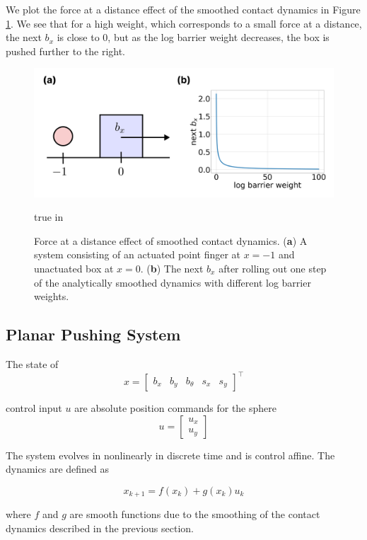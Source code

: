\documentclass[journal]{IEEEtran}
\begin{document}
We plot the force at a distance effect of the smoothed contact dynamics in Figure \ref{fig:smoothed_contact_dynamics}. We see that for a high weight, which corresponds to a small force at a distance, the next $b_x$ is close to 0, but as the log barrier weight decreases, the box is pushed further to the right.

\begin{figure}[t]
	\centering\includegraphics[width = 0.45 \textwidth]
	{figures/smoothed_contact_dynamics.png}
    \caption{Force at a distance effect of smoothed contact dynamics. (\textbf{a}) A system consisting of an actuated point finger at $x=-1$ and unactuated box at $x=0$. (\textbf{b}) The next $b_x$ after rolling out one step of the analytically smoothed dynamics with different log barrier weights.}
	\label{fig:smoothed_contact_dynamics}
	 true in
\end{figure}

\subsection{Planar Pushing System}
The state of 
\begin{equation}
    x = \begin{bmatrix}b_x & b_y & b_{\theta}& s_x& s_y\end{bmatrix}^\top
\end{equation}

control input $u$ are absolute position commands for the sphere
\begin{equation}
    u = \begin{bmatrix}u_x\\ u_y \end{bmatrix}
\end{equation}

The system evolves in nonlinearly in discrete time and is control affine. The dynamics are defined as

\begin{equation}
    x_{k+1} = f(x_k) + g(x_k)u_k
\end{equation}

where $f$ and $g$ are smooth functions due to the smoothing of the contact dynamics described in the previous section.
\end{document}

